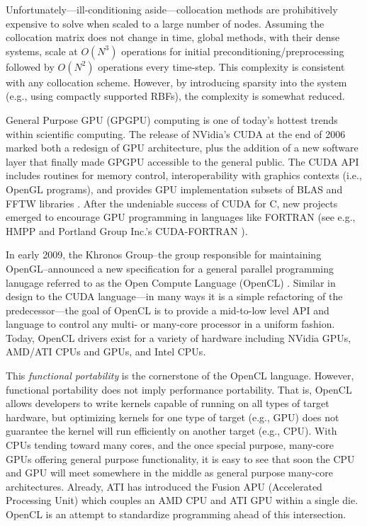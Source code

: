 Unfortunately---ill-conditioning aside---collocation methods are prohibitively expensive to solve when scaled to a large number of nodes. Assuming the collocation matrix does not change in time, global methods, with their dense systems, scale at $O(N^3)$ operations for initial preconditioning/preprocessing followed by $O(N^2)$ operations every time-step. This complexity is consistent with any collocation scheme. However, by introducing sparsity into the system (e.g., using compactly supported RBFs), the complexity is somewhat reduced.



General Purpose GPU (GPGPU) computing is one of today's hottest trends within scientific computing. 
The release of NVidia's CUDA at the end of 2006 marked both a 
redesign of GPU architecture, plus the addition of a new software layer that finally made GPGPU accessible to the general public. The CUDA API includes routines for memory control, interoperability with graphics contexts (i.e., 
OpenGL programs), and provides GPU implementation subsets of BLAS and FFTW libraries \cite{CudaGuide2011}. After the undeniable success of CUDA for C, new projects emerged to encourage GPU programming in languages like FORTRAN (see e.g., HMPP \cite{HMPP2009} and Portland Group Inc.'s CUDA-FORTRAN \cite{CudaFortran2009}). 

In early 2009, the Khronos Group--the group responsible for maintaining OpenGL--announced a new specification for a general 
parallel programming lanugage referred to as the Open Compute Language (OpenCL) \cite{OpenCL2009}. Similar in design to the CUDA language---in many ways it is a simple refactoring of the predecessor---the goal of OpenCL is to provide a mid-to-low level API and language to control any multi- or many-core processor in a uniform fashion. Today, OpenCL drivers exist for a variety of hardware including NVidia GPUs, AMD/ATI CPUs and GPUs, and Intel CPUs. 

This \textit{functional portability} is the cornerstone of the OpenCL language. However, functional portability does not imply performance portability. That is, OpenCL allows developers to write kernels capable of running on all types of target hardware, but optimizing kernels for one type of target (e.g., GPU) does not guarantee the kernel will run efficiently on another target (e.g., CPU).
With CPUs tending toward many cores, and the once special purpose, many-core GPUs offering general purpose functionality, it is easy to see that soon the CPU and GPU will meet somewhere in the middle as general purpose many-core architectures. Already, ATI has introduced the Fusion APU (Accelerated Processing Unit) which couples an AMD CPU and ATI GPU within a single die. OpenCL is an attempt to standardize programming ahead of this intersection. 

